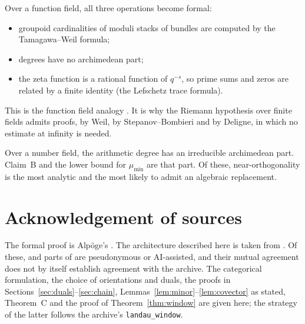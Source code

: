\documentclass[11pt]{amsart}
\theoremstyle{definition}
\theoremstyle{remark}
\begin{document}
Over a function field, all three operations become formal:
\begin{itemize}
\item groupoid cardinalities of moduli stacks of bundles are computed by the Tamagawa--Weil formula;
\item degrees have no archimedean part;
\item the zeta function is a rational function of $q^{-s}$, so prime sums and zeros are related by a finite identity (the Lefschetz trace formula).
\end{itemize}
This is the function field analogy \cite{nLab-FFA}. It is why the Riemann hypothesis over finite fields admits proofs, by Weil, by Stepanov--Bombieri and by Deligne, in which no estimate at infinity is needed.

Over a number field, the arithmetic degree has an irreducible archimedean part. Claim~B and the lower bound for $\mu_{\min}$ are that part. Of these, near-orthogonality is the most analytic and the most likely to admit an algebraic replacement.

\section*{Acknowledgement of sources}
The formal proof is Alp\"oge's \cite{Alpoge}. The architecture described here is taken from \cite{Zhang,nasqret,golf}. Of these, \cite{nasqret} and parts of \cite{golf} are pseudonymous or AI-assisted, and their mutual agreement does not by itself establish agreement with the archive. The categorical formulation, the choice of orientations and duals, the proofs in Sections~\ref{sec:duals}--\ref{sec:chain}, Lemmas~\ref{lem:minor}--\ref{lem:covector} as stated, Theorem~C and the proof of Theorem~\ref{thm:window} are given here; the strategy of the latter follows the archive's \texttt{landau\_window}.
\end{document}
